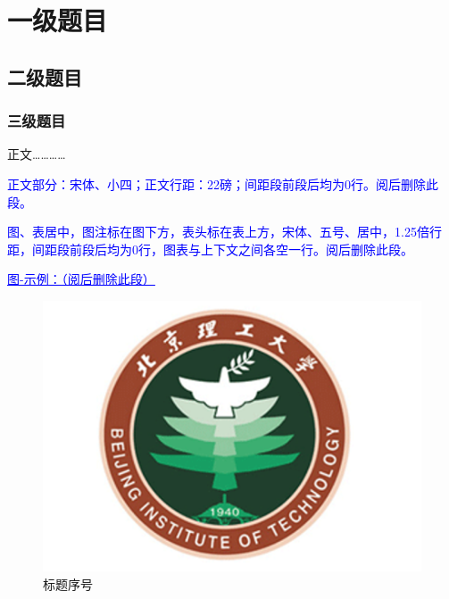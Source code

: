%
%
%
%
%
%

\chapter{一级题目}

\section{二级题目}

\subsection{三级题目}

正文……\parencite{yuFeiJiZongTiDuoXueKeSheJiYouHuaDeXianZhuangYuFaZhanFangXiang2008}……\cite{Hajela2012Application}

\textcolor{blue}{正文部分：宋体、小四；正文行距：22磅；间距段前段后均为0行。阅后删除此段。}

\textcolor{blue}{图、表居中，图注标在图下方，表头标在表上方，宋体、五号、居中，1.25倍行距，间距段前段后均为0行，图表与上下文之间各空一行。阅后删除此段。}

\textcolor{blue}{\underline{\underline{图-示例：（阅后删除此段）}}}


\begin{figure}[htbp]
  \centering
  \includegraphics[]{images/bit_logo.png}
  \caption{标题序号}\label{标题序号} %
\end{figure}

